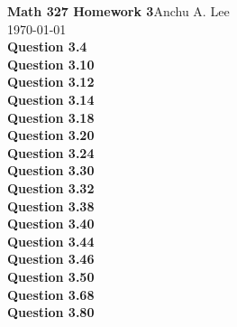 \documentclass{article}
\begin{document}
    \noindent\textbf{Math 327 Homework 3}\hfill Anchu A. Lee\\
    \noindent\today\\
    
    \noindent\textbf{Question 3.4}\\
    \textbf{Question 3.10}\\
    \textbf{Question 3.12}\\
    \textbf{Question 3.14}\\
    \textbf{Question 3.18}\\
    \textbf{Question 3.20}\\
    \textbf{Question 3.24}\\
    \textbf{Question 3.30}\\
    \textbf{Question 3.32}\\
    \textbf{Question 3.38}\\
    \textbf{Question 3.40}\\
    \textbf{Question 3.44}\\
    \textbf{Question 3.46}\\
    \textbf{Question 3.50}\\
    \textbf{Question 3.68}\\
    \textbf{Question 3.80}\\
\end{document}
